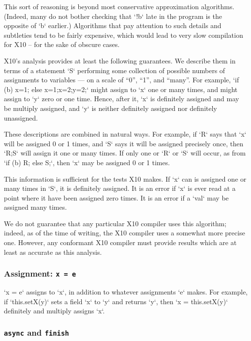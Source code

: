 This sort of reasoning is beyond  most conservative approximation algorithms.
(Indeed, many do not bother checking that \xcd`!b` late in the program is the
opposite of \xcd`b` earlier.)
Algorithms that pay attention to such details and subtleties tend to be
fairly expensive, which would lead to very slow compilation for X10 -- for the
sake of obscure cases.

X10's analysis provides at least the following guarantees. We describe them in
terms of a statement \xcd`S` performing some collection of possible numbers of
assignments to variables --- on a scale of ``0'', ``1'', and ``many''. For
example, \xcd`if (b) x=1; else {x=1;x=2;y=2;}` might assign to \xcd`x` one or
many times, and might assign to \xcd`y` zero or one time. Hence, after it,
\xcd`x` is definitely assigned and may be multiply assigned, and \xcd`y` is
neither definitely assigned nor definitely unassigned.  

These descriptions are combined in natural ways.  For example, if \xcd`R` says
that \xcd`x` will be assigned 0 or 1 times, and \xcd`S` says it will be
assigned precisely once, then \xcd`R;S` will assign it one or many times.  If
only one or \xcd`R` or \xcd`S` will occur, as from \xcd`if (b) R; else S;`, 
then \xcd`x` may be assigned 0 or 1 times. 

This information is sufficient for the tests X10 makes.  If \xcd`x` can is
assigned one or many times in \xcd`S`, it is definitely assigned.  It is an
error if 
\xcd`x` is ever read at a point where it have been assigned zero times.  It is
an error if a \xcd`val` may be assigned many times.


We do not guarantee that any particular X10 compiler uses this algorithm;
indeed, as of the time of writing, the X10 compiler uses a somewhat more
precise one.  However, any conformant X10 compiler must provide results which
are at least as accurate as this analysis.




\subsubsection{Assignment: {\tt x = e}}   

\xcd`x = e` assigns to \xcd`x`, in addition to whatever assignments
\xcd`e` makes.   For example, if \xcd`this.setX(y)` sets a field \xcd`x` to
\xcd`y` and returns \xcd`y`, then \xcd`x = this.setX(y)` definitely and
multiply assigns \xcd`x`.  

\subsubsection{{\tt async} and {\tt finish}}

